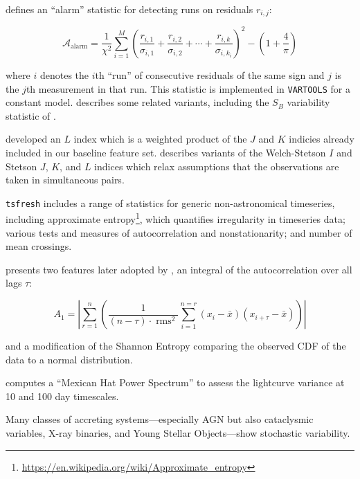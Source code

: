 \documentclass[DM,authoryear,toc]{lsstdoc}
\begin{document}
\citet{Tamuz:06:EBfitting} defines an ``alarm'' statistic for detecting runs on residuals $r_{i,j}$: 

\begin{equation}
\mathcal{A}_{\mathrm{alarm}}=\frac{1}{\chi^{2}} \sum_{i=1}^{M}\left(\frac{r_{i, 1}}{\sigma_{i, 1}}+\frac{r_{i, 2}}{\sigma_{i, 2}}+\cdots+\frac{r_{i, k}}{\sigma_{i, k_{i}}}\right)^{2}-\left(1+\frac{4}{\pi}\right)
\end{equation}

where $i$ denotes the $i$th ``run'' of consecutive residuals of the same sign and $j$ is the $j$th measurement in that run.
This statistic is implemented in \texttt{VARTOOLS} for a constant model.
\citet{Sokolovsky:17:VariabilityDetection} describes some related variants, including the $S_B$ variability statistic of \citet{ArellanoFerro:12:RRLyrDetection}.

\citet{1996PASP..108..851S} developed an $L$ index which is a weighted product of the $J$ and $K$ indicies already included in our baseline feature set.
\citet{Sokolovsky:17:VariabilityDetection} describes variants of the Welch-Stetson $I$ \citet{Welch:93:WelchStetson} and Stetson $J$, $K$, and $L$ indices which relax assumptions that the observations are taken in simultaneous pairs.

\texttt{tsfresh} includes a range of statistics for generic non-astronomical timeseries, including approximate entropy\footnote{\url{https://en.wikipedia.org/wiki/Approximate_entropy}}, which quantifies irregularity in timeseries data; various tests and measures of autocorrelation and nonstationarity; and number of mean crossings.

\citet{Mislis:16:SIDRA} presents two features later adopted by \citet{Narayan:18:ANTARES}, an integral of the autocorrelation over all lags $\tau$:

\begin{equation}
  A_{1}=\left|\sum_{r=1}^{n}\left(\frac{1}{(n-\tau) \cdot \operatorname{rms}^{2}} \sum_{i=1}^{n=r}\left(x_{i}-\bar{x}\right)\left(x_{i+\tau}-\bar{x}\right)\right)\right|
\end{equation}

and a modification of the Shannon Entropy comparing the observed CDF of the data to a normal distribution.

\citet{Sanchez-Saez:21:AlertClassification} computes a ``Mexican Hat Power Spectrum'' to assess the lightcurve variance at 10 and 100 day timescales.

Many classes of accreting systems---especially AGN but also cataclysmic variables, X-ray binaries, and Young Stellar Objects---show stochastic variability.
\end{document}
